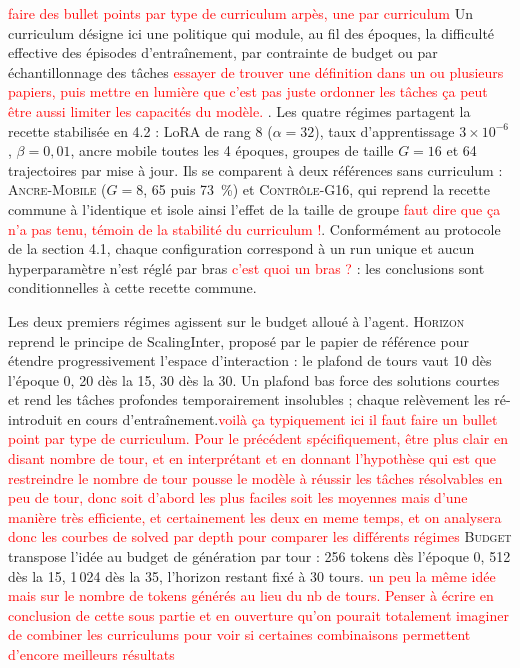 \documentclass[11pt,a4paper]{article}
\begin{document}
\textcolor{red}{faire des bullet points par type de curriculum arpès, une par curriculum} 
Un curriculum désigne ici une politique qui module, au fil des époques, la difficulté effective des épisodes d'entraînement, par contrainte de budget ou par échantillonnage des tâches \textcolor{red}{essayer de trouver une définition dans un ou plusieurs papiers, puis mettre en lumière que c'est pas juste ordonner les tâches ça peut être aussi limiter les capacités du modèle.} . Les quatre régimes partagent la recette stabilisée en 4.2 : LoRA de rang 8 ($\alpha=32$), taux d'apprentissage $3\times10^{-6}$, $\beta=0{,}01$, ancre mobile toutes les 4 époques, groupes de taille $G=16$ et 64 trajectoires par mise à jour. Ils se comparent à deux références sans curriculum : \textsc{Ancre-Mobile} ($G=8$, 65 puis 73~\%) et \textsc{Contrôle-G16}, qui reprend la recette commune à l'identique et isole ainsi l'effet de la taille de groupe \textcolor{red}{faut dire que ça n'a pas tenu, témoin de la stabilité du curriculum !}. Conformément au protocole de la section 4.1, chaque configuration correspond à un run unique et aucun hyperparamètre n'est réglé par bras \textcolor{red}{c'est quoi un bras ? } : les conclusions sont conditionnelles à cette recette commune.

Les deux premiers régimes agissent sur le budget alloué à l'agent. \textsc{Horizon} reprend le principe de ScalingInter, proposé par le papier de référence pour étendre progressivement l'espace d'interaction \cite{xi_agentgym-rl_2025} : le plafond de tours vaut 10 dès l'époque 0, 20 dès la 15, 30 dès la 30. Un plafond bas force des solutions courtes et rend les tâches profondes temporairement insolubles ; chaque relèvement les ré-introduit en cours d'entraînement.\textcolor{red}{voilà ça typiquement ici il faut faire un bullet point par type de curriculum. Pour le précédent spécifiquement, être plus clair en disant nombre de tour, et en interprétant et en donnant l'hypothèse qui est que restreindre le nombre de tour pousse le modèle à réussir les tâches résolvables en peu de tour, donc soit d'abord les plus faciles soit les moyennes mais d'une manière très efficiente, et certainement les deux en meme temps, et on analysera donc les courbes de solved par depth pour comparer les différents régimes}  \textsc{Budget} transpose l'idée au budget de génération par tour : 256 tokens dès l'époque 0, 512 dès la 15, 1\,024 dès la 35, l'horizon restant fixé à 30 tours. \textcolor{red}{un peu la même idée mais sur le nombre de tokens générés au lieu du nb de tours. Penser à écrire en conclusion de cette sous partie et en ouverture qu'on pourait totalement imaginer de combiner les curriculums pour voir si certaines combinaisons permettent d'encore meilleurs résultats} 
\end{document}
